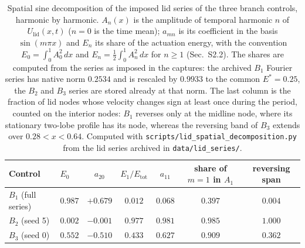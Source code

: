 \begin{table}[t]
\centering
\caption{Spatial sine decomposition of the imposed lid series of the three branch
controls, harmonic by harmonic. $A_n(x)$ is the amplitude of temporal harmonic $n$
of $U_{\mathrm{lid}}(x,t)$ ($n=0$ is the time mean); $a_{mn}$ is its coefficient in
the basis $\sin(m\pi x)$ and $E_n$ its share of the actuation energy, with the
convention $E_0=\int_0^1A_0^2\,dx$ and $E_n=\tfrac12\int_0^1A_n^2\,dx$ for $n\ge1$
(Sec.~S2.2). The shares are computed from the series as imposed in the captures:
the archived $B_1$ Fourier series has native norm $0.2534$ and is rescaled by
$0.9933$ to the common $E^\ast=0.25$, the $B_2$ and $B_3$ series are stored already
at that norm. The last column is the fraction of lid nodes whose velocity changes
sign at least once during the period, counted on the interior nodes:
$B_1$ reverses only at the midline node, where its stationary two-lobe profile has
its node, whereas the reversing band of $B_3$ extends over $0.28<x<0.64$. Computed
with \texttt{scripts/lid\_spatial\_decomposition.py} from the lid series archived in
\texttt{data/lid\_series/}.}
\label{tab:lid_structure}
\footnotesize
\setlength{\tabcolsep}{4pt}
\begin{tabular}{llccccc}
\toprule
Control & $E_0$ & $a_{20}$ & $E_1/E_{\mathrm{tot}}$ & $a_{11}$ & share of $m=1$ in $A_1$ & reversing span\\
\midrule
$B_1$ (full series)  & $0.987$ & $+0.679$ & $0.012$ & $0.068$ & $0.397$ & $0.004$\\
$B_2$ (seed 5)       & $0.002$ & $-0.001$ & $0.977$ & $0.981$ & $0.985$ & $1.000$\\
$B_3$ (seed 0)       & $0.552$ & $-0.510$ & $0.433$ & $0.627$ & $0.909$ & $0.362$\\
\bottomrule
\end{tabular}
\end{table}
